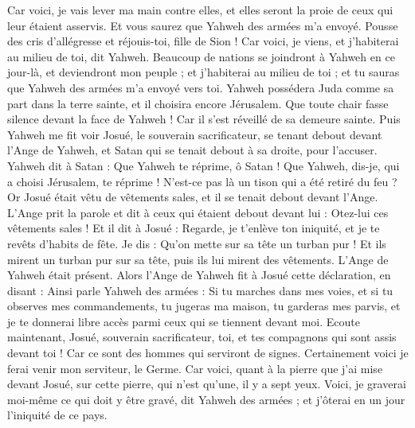 \begin{multicols}{2}
Car voici, je vais lever ma main contre elles, et elles seront la proie de ceux qui leur étaient asservis. Et vous saurez que Yahweh des armées m'a envoyé.
Pousse des cris d’allégresse et réjouis-toi, fille de Sion ! Car voici, je viens, et j'habiterai au milieu de toi, dit Yahweh.
Beaucoup de nations se joindront à Yahweh en ce jour-là, et deviendront mon peuple ; et j'habiterai au milieu de toi ; et tu sauras que Yahweh des armées m'a envoyé vers toi.
Yahweh possédera Juda comme sa part dans la terre sainte, et il choisira encore Jérusalem.
Que toute chair fasse silence devant la face de Yahweh ! Car il s'est réveillé de sa demeure sainte.
\VerseOne{}Puis Yahweh me fit voir Josué, le souverain sacrificateur, se tenant debout devant l'Ange de Yahweh, et Satan qui se tenait debout à sa droite, pour l’accuser.
Yahweh dit à Satan : Que Yahweh te réprime, ô Satan ! Que Yahweh, dis-je, qui a choisi Jérusalem, te réprime ! N’est-ce pas là un tison qui a été retiré du feu ?
Or Josué était vêtu de vêtements sales, et il se tenait debout devant l'Ange.
L’Ange prit la parole et dit à ceux qui étaient debout devant lui : Otez-lui ces vêtements sales ! Et il dit à Josué : Regarde, je t’enlève ton iniquité, et je te revêts d’habits de fête.
Je dis : Qu'on mette sur sa tête un turban pur ! Et ils mirent un turban pur sur sa tête, puis ils lui mirent des vêtements. L’Ange de Yahweh était présent.
Alors l'Ange de Yahweh fit à Josué cette déclaration, en disant :
Ainsi parle Yahweh des armées : Si tu marches dans mes voies, et si tu observes mes commandements, tu jugeras ma maison, tu garderas mes parvis, et je te donnerai libre accès parmi ceux qui se tiennent devant moi.
Ecoute maintenant, Josué, souverain sacrificateur, toi, et tes compagnons qui sont assis devant toi ! Car ce sont des hommes qui serviront de signes. Certainement voici je ferai venir mon serviteur, le Germe.
Car voici, quant à la pierre que j'ai mise devant Josué, sur cette pierre, qui n'est qu'une, il y a sept yeux. Voici, je graverai moi-même ce qui doit y être gravé, dit Yahweh des armées ; et j'ôterai en un jour l'iniquité de ce pays.

\end{multicols}
